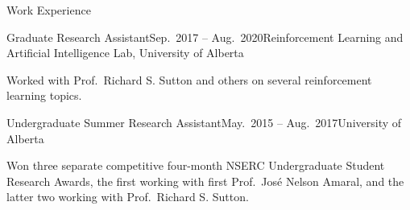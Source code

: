 \documentclass{cv}
\begin{document}
\begin{rSection}{Work Experience}
\begin{rSubsection}{Graduate Research Assistant}{Sep.\ 2017 -- Aug.\ 2020}{Reinforcement Learning and Artificial Intelligence Lab, University of Alberta}
    \item Worked with Prof.\ Richard S. Sutton and others on several reinforcement learning topics.
\end{rSubsection}

\begin{rSubsection}{Undergraduate Summer Research Assistant}{May.\ 2015 -- Aug.\ 2017}{University of Alberta}
    \item Won three separate competitive four-month NSERC Undergraduate Student Research Awards, the first working with first Prof.\ Jos{\'{e}} Nelson Amaral, and the latter two working with Prof.\ Richard S. Sutton.
\end{rSubsection}

\end{rSection}

\end{document}

